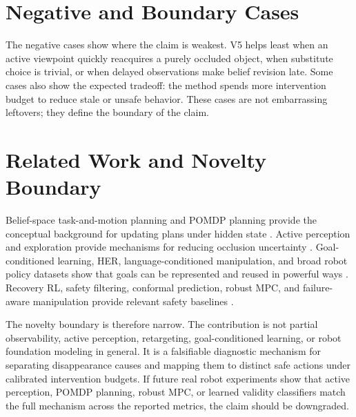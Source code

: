\documentclass{article}
\begin{document}
\section{Negative and Boundary Cases}


The negative cases show where the claim is weakest. V5 helps least when an active viewpoint quickly reacquires a purely occluded object, when substitute choice is trivial, or when delayed observations make belief revision late. Some cases also show the expected tradeoff: the method spends more intervention budget to reduce stale or unsafe behavior. These cases are not embarrassing leftovers; they define the boundary of the claim.

\section{Related Work and Novelty Boundary}
Belief-space task-and-motion planning and POMDP planning provide the conceptual background for updating plans under hidden state \citep{brohan2022rt1,mees2022calvin,jiang2022vima,mandlekar2021robomimic,thananjeyan2021recovery,ma2025a1,butepage2019from2}. Active perception and exploration provide mechanisms for reducing occlusion uncertainty \citep{liu2022towards3,pan2024task4,sui2017goaldirected5,koenig1998xavier6,h2025ulag7,liu2026activevla8,chowdhury2025lagea9}. Goal-conditioned learning, HER, language-conditioned manipulation, and broad robot policy datasets show that goals can be represented and reused in powerful ways \citep{kakroudi2026a10,zhaole2023dexdlo11,poupart2015approximate12,matsumoto2022goaldirected13,carr2021safe14,garrett2020online15,dastider2025crossembodiment16}. Recovery RL, safety filtering, conformal prediction, robust MPC, and failure-aware manipulation provide relevant safety baselines \citep{herse2024simulation17,karami2009partially18,thach2023defgoalnet19,gui2024goalgrasp20,wolfe2010combined21,quinteropena2022humanguided22,chen2025goalvla23,omidshafiei2017decentralized24,curtis2024partially25}.

The novelty boundary is therefore narrow. The contribution is not partial observability, active perception, retargeting, goal-conditioned learning, or robot foundation modeling in general. It is a falsifiable diagnostic mechanism for separating disappearance causes and mapping them to distinct safe actions under calibrated intervention budgets. If future real robot experiments show that active perception, POMDP planning, robust MPC, or learned validity classifiers match the full mechanism across the reported metrics, the claim should be downgraded.
\end{document}
